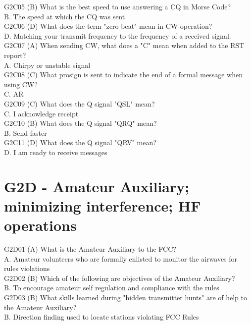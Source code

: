 \documentclass[12pt,letterpaper]{report}
\begin{document}
G2C05 (B) What is the best speed to use answering a CQ in Morse Code?\\
B. The speed at which the CQ was sent\\

G2C06 (D) What does the term "zero beat" mean in CW operation?\\
D. Matching your transmit frequency to the frequency of a received signal.\\

G2C07 (A) When sending CW, what does a "C" mean when added to the RST report?\\
A. Chirpy or unstable signal\\

G2C08 (C) What prosign is sent to indicate the end of a formal message when using CW? \\
C. AR\\

G2C09 (C) What does the Q signal "QSL" mean?\\
C. I acknowledge receipt\\

G2C10 (B) What does the Q signal "QRQ" mean?\\
B. Send faster\\

G2C11 (D) What does the Q signal "QRV" mean?\\
D. I am ready to receive messages\\

\section{G2D - Amateur Auxiliary; minimizing interference; HF operations}

G2D01 (A) What is the Amateur Auxiliary to the FCC?\\
A. Amateur volunteers who are formally enlisted to monitor the airwaves for rules violations \\

G2D02 (B) Which of the following are objectives of the Amateur Auxiliary?\\
B. To encourage amateur self regulation and compliance with the rules \\

G2D03 (B) What skills learned during "hidden transmitter hunts" are of help to the Amateur Auxiliary? \\
B. Direction finding used to locate stations violating FCC Rules\\
\end{document}
